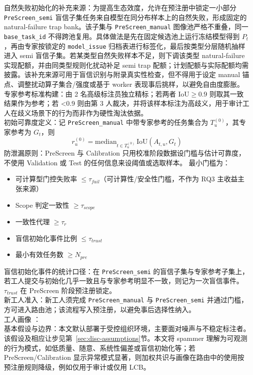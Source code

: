 \noindent 自然失败初始化的补充来源：为提高生态效度，允许在预注册中锁定一小部分 \texttt{PreScreen\_semi} 盲信子集任务来自模型在同分布样本上的自然失败，形成固定的 natural-failure trap bank。该子集与 \texttt{PreScreen\_manual} 图像池严格不重叠，同一 \texttt{base\_task\_id} 不得跨池复用。具体做法是先在固定候选池上运行冻结模型得到 $P_t$，再由专家按锁定的 \texttt{model\_issue} 归档表进行标签化，最后按类型分层随机抽样进入 semi 盲信子集。若某类型自然失败样本不足，则下调该类型 natural-failure 实现配额，并由同类型规则化扰动补足 semi trap 配额；计划配额与实际配额均需披露。该补充来源可用于盲信识别与附录真实性检查，但不得用于设定 manual 锚点、调整扰动算子集合/强度或基于 worker 表现事后挑样，以避免自由度膨胀。
\\ 专家参考标准构建：由 2 名高级标注员独立精标；若两者 $\mathrm{IoU}\geq0.9$ 则取其一致结果作为参考；若 <0.9 则由第 3 人裁决，并将该样本标注为高歧义，用于审计工人在歧义场景下的行为而非作为硬性淘汰依据。
\\ 初始可靠度定义：记 \texttt{PreScreen\_manual} 中带专家参考的任务集合为 $T_u^{(0)}$，其专家参考为 $G_t$，则
\[r_u^{\left(0\right)}=\mathrm{median}_{t\in T_u^{(0)}}\,\mathrm{IoU}\left(A_{t,u},G_t\right)\]
防泄漏原则：PreScreen 与 Calibration 只用校准阶段数据设门槛与估计可靠度，不使用 Validation 或 Test 的任何信息来设阈值或选取样本。
最小门槛为：
\begin{itemize}
    \item 可计算型门控失败率 $\le\tau_{fail}$（可计算性/安全性门槛，不作为 RQ3 主收益主张来源）
    \item Scope 判定一致性 $\geq\tau_{scope}$
    \item 一致性代理 $\geq\tau_r$
    \item 盲信初始化事件比例 $\le\tau_{trust}$
    \item 最小有效任务数 $\geq N_{pre}$
\end{itemize}
\noindent 盲信初始化事件的统计口径：在 \texttt{PreScreen\_semi} 的盲信子集与专家参考子集上，若工人提交与初始化几乎一致且与专家参考明显不一致，则记为一次盲信事件。$\tau_{trust}$ 在 PreScreen 阶段预注册锁定。
\\ 新工人准入：新工人须完成 \texttt{PreScreen\_manual} 与 \texttt{PreScreen\_semi} 并通过门槛，方可进入路由池；该流程写入预注册，以避免事后选择性纳入。
\\ 工人画像 ：
\\ 基本假设与边界：本文默认部署于受控组织环境，主要面对噪声与不稳定标注者。该假设及相应让步见第~\ref{sec:disc-assumptions}节。本文将 spammer 理解为可观测的行为模式，如低质量、随意、系统性偏差或盲信初始化等；若 PreScreen/Calibration 显示异常模式显著，则加权共识与画像在路由中的使用按预注册规则降级，例如仅用于审计或仅用 LCB。

